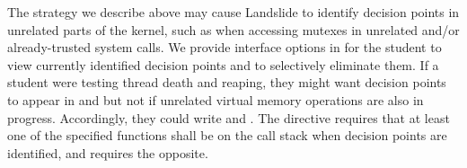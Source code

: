 The strategy we describe above may cause Landslide to identify decision points in unrelated parts of the kernel, such as when accessing mutexes in unrelated and/or already-trusted system calls.
We provide interface options in  for the student to view currently identified decision points and to selectively eliminate them.
If a student were testing thread death and reaping, they might want decision points to appear in  and  but not if unrelated virtual memory operations are also in progress.
Accordingly, they could write  and  .
The  directive requires that at least one of the specified functions shall be on the call stack when decision points are identified, and  requires the opposite.


%

